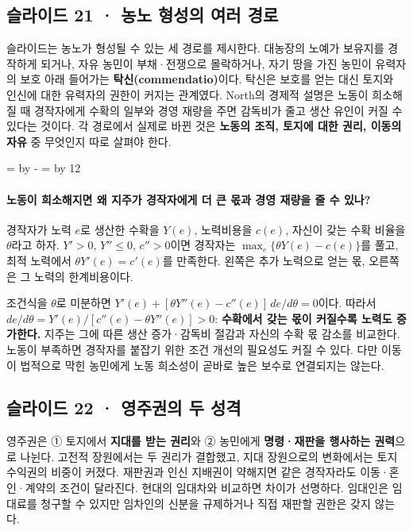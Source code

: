 \documentclass[10pt,a4paper]{article}
\newcommand{\ReserveQuestionSpace}{%
  \par\begingroup
  \dimen0=\pagegoal \advance\dimen0 by -\pagetotal
  \dimen2=\baselineskip \multiply\dimen2 by 12
  \ifdim\dimen0<\dimen2 \newpage\fi
  \endgroup}
\begin{document}
\subsection{슬라이드 21 · 농노 형성의 여러 경로}
슬라이드는 농노가 형성될 수 있는 세 경로를 제시한다. 대농장의 노예가 보유지를 경작하게 되거나, 자유 농민이 부채·전쟁으로 몰락하거나, 자기 땅을 가진 농민이 유력자의 보호 아래 들어가는 \textbf{탁신(commendatio)}이다. 탁신은 보호를 얻는 대신 토지와 인신에 대한 유력자의 권한이 커지는 관계였다. North의 경제적 설명은 노동이 희소해질 때 경작자에게 수확의 일부와 경영 재량을 주면 감독비가 줄고 생산 유인이 커질 수 있다는 것이다. 각 경로에서 실제로 바뀐 것은 \textbf{노동의 조직, 토지에 대한 권리, 이동의 자유} 중 무엇인지 따로 살펴야 한다.\par

\ReserveQuestionSpace
\paragraph{노동이 희소해지면 왜 지주가 경작자에게 더 큰 몫과 경영 재량을 줄 수 있나?}
경작자가 노력 $e$로 생산한 수확을 $Y(e)$, 노력비용을 $c(e)$, 자신이 갖는 수확 비율을 $\theta$라고 하자. $Y'>0$, $Y''\leq0$, $c''>0$이면 경작자는 $\max_e\{\theta Y(e)-c(e)\}$를 풀고, 최적 노력에서 $\theta Y'(e)=c'(e)$를 만족한다. 왼쪽은 추가 노력으로 얻는 몫, 오른쪽은 그 노력의 한계비용이다.\par

조건식을 $\theta$로 미분하면 $Y'(e)+[\theta Y''(e)-c''(e)]\,de/d\theta=0$이다. 따라서 $de/d\theta=Y'(e)/[c''(e)-\theta Y''(e)]>0$: \textbf{수확에서 갖는 몫이 커질수록 노력도 증가한다.} 지주는 그에 따른 생산 증가·감독비 절감과 자신의 수확 몫 감소를 비교한다. 노동이 부족하면 경작자를 붙잡기 위한 조건 개선의 필요성도 커질 수 있다. 다만 이동이 법적으로 막힌 농민에게 노동 희소성이 곧바로 높은 보수로 연결되지는 않는다.\par

\subsection{슬라이드 22 · 영주권의 두 성격}
영주권은 ① 토지에서 \textbf{지대를 받는 권리}와 ② 농민에게 \textbf{명령·재판을 행사하는 권력}으로 나뉜다. 고전적 장원에서는 두 권리가 결합했고, 지대 장원으로의 변화에서는 토지 수익권의 비중이 커졌다. 재판권과 인신 지배권이 약해지면 같은 경작자라도 이동·혼인·계약의 조건이 달라진다. 현대의 임대차와 비교하면 차이가 선명하다. 임대인은 임대료를 청구할 수 있지만 임차인의 신분을 규제하거나 직접 재판할 권한은 갖지 않는다.\par
\end{document}
